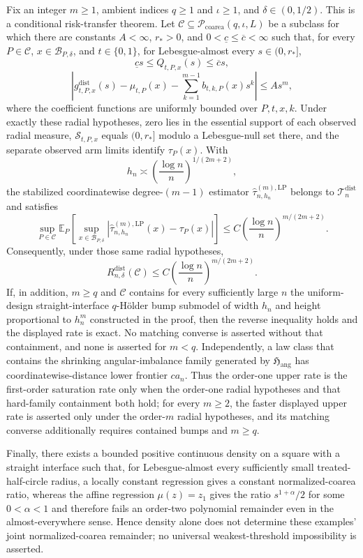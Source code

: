 Fix an integer \(m\geq1\), ambient indices \(q\geq1\) and \(\iota\geq1\), and \(\delta\in(0,1/2)\).  This is a conditional risk-transfer theorem.  Let \(\mathcal C\subseteq\mathcal P_{\mathrm{coarea}}(q,\iota,L)\) be a subclass for which there are constants \(A<\infty\), \(r_*>0\), and \(0<\underline c\leq\overline c<\infty\) such that, for every \(P\in\mathcal C\), \(x\in\mathcal B_{P,\delta}\), and \(t\in\{0,1\}\), for Lebesgue-almost every \(s\in(0,r_*]\),
\[
 \underline c s\leq Q_{t,P,x}(s)\leq\overline c s,
\]
\[
 \left|g^{\mathrm{dist}}_{t,P,x}(s)-\mu_{t,P}(x)
 -\sum_{k=1}^{m-1}b_{t,k,P}(x)s^k\right|
 \leq As^m,
\]
where the coefficient functions are uniformly bounded over \(P,t,x,k\).  Under exactly these radial hypotheses, zero lies in the essential support of each observed radial measure, \(\mathcal S_{t,P,x}\) equals \((0,r_*]\) modulo a Lebesgue-null set there, and the separate observed arm limits identify \(\tau_P(x)\).  With
\[
 h_n\asymp\left(\frac{\log n}{n}\right)^{1/(2m+2)},
\]
the stabilized coordinatewise degree-\((m-1)\) estimator \(\widehat\tau^{(m),\mathrm{LP}}_{n,h_n}\) belongs to \(\mathcal T_n^{\mathrm{dist}}\) and satisfies
\[
 \sup_{P\in\mathcal C}\mathbb E_P\!\left[
 \sup_{x\in\mathcal B_{P,\delta}}
 \left|\widehat\tau^{(m),\mathrm{LP}}_{n,h_n}(x)-\tau_P(x)\right|
 \right]
 \leq C\left(\frac{\log n}{n}\right)^{m/(2m+2)}.
\]
Consequently, under those same radial hypotheses,
\[
 R_{n,\delta}^{\mathrm{dist}}(\mathcal C)
 \leq C\left(\frac{\log n}{n}\right)^{m/(2m+2)}.
\]
If, in addition, \(m\geq q\) and \(\mathcal C\) contains for every sufficiently large \(n\) the uniform-design straight-interface \(q\)-H\"older bump submodel of width \(h_n\) and height proportional to \(h_n^m\) constructed in the proof, then the reverse inequality holds and the displayed rate is exact.  No matching converse is asserted without that containment, and none is asserted for \(m<q\).  Independently, a law class that contains the shrinking angular-imbalance family generated by \(\mathfrak H_{\mathrm{ang}}\) has coordinatewise-distance lower frontier \(ca_n\).  Thus the order-one upper rate is the first-order saturation rate only when the order-one radial hypotheses and that hard-family containment both hold; for every \(m\geq2\), the faster displayed upper rate is asserted only under the order-\(m\) radial hypotheses, and its matching converse additionally requires contained bumps and \(m\geq q\).

Finally, there exists a bounded positive continuous density on a square with a straight interface such that, for Lebesgue-almost every sufficiently small treated-half-circle radius, a locally constant regression gives a constant normalized-coarea ratio, whereas the affine regression \(\mu(z)=z_1\) gives the ratio \(s^{1+\alpha}/2\) for some \(0<\alpha<1\) and therefore fails an order-two polynomial remainder even in the almost-everywhere sense.  Hence density alone does not determine these examples' joint normalized-coarea remainder; no universal weakest-threshold impossibility is asserted.